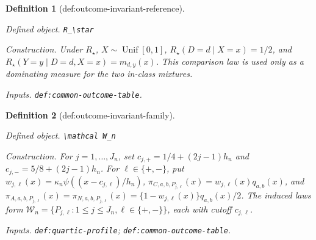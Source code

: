 \documentclass{article}
\newtheorem{definition}{Definition}
\begin{document}
\begin{definition}[def:outcome-invariant-reference]\label{def:outcome-invariant-reference}
\par\smallskip\noindent\emph{Defined object.} \texttt{R\_\allowbreak{}\textbackslash{}\allowbreak{}star}
\par\smallskip\noindent\emph{Construction.} Under \(R_\star\), \(X\sim\operatorname{Unif}[0,1]\), \(R_\star(D=d\mid X=x)=1/2\), and \(R_\star(Y=y\mid D=d,X=x)=m_{d,y}(x)\). This comparison law is used only as a dominating measure for the two in-class mixtures.
\par\smallskip\noindent\emph{Inputs.} \texttt{def:\allowbreak{}common-\allowbreak{}outcome-\allowbreak{}table}.
\end{definition}

\begin{definition}[def:outcome-invariant-family]\label{def:outcome-invariant-family}
\par\smallskip\noindent\emph{Defined object.} \texttt{\textbackslash{}\allowbreak{}mathcal W\_\allowbreak{}n}
\par\smallskip\noindent\emph{Construction.} For \(j=1,\ldots,J_n\), set \(c_{j,+}=1/4+(2j-1)h_n\) and \(c_{j,-}=5/8+(2j-1)h_n\). For \(\ell\in\{+,-\}\), put \(w_{j,\ell}(x)=\kappa_n\psi((x-c_{j,\ell})/h_n)\), \(\pi_{C,a,b,P_{j,\ell}}(x)=w_{j,\ell}(x)q_{a,b}(x)\), and \(\pi_{A,a,b,P_{j,\ell}}(x)=\pi_{N,a,b,P_{j,\ell}}(x)=\{1-w_{j,\ell}(x)\}q_{a,b}(x)/2\). The induced laws form \(\mathcal W_n=\{P_{j,\ell}:1\le j\le J_n,\ell\in\{+,-\}\}\), each with cutoff \(c_{j,\ell}\).
\par\smallskip\noindent\emph{Inputs.} \texttt{def:\allowbreak{}quartic-\allowbreak{}profile}; \texttt{def:\allowbreak{}common-\allowbreak{}outcome-\allowbreak{}table}.
\end{definition}
\end{document}

